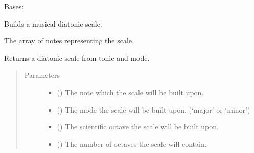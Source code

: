 \documentclass[letterpaper,10pt,english]{sphinxmanual}
\begin{document}

\begin{fulllineitems}
\label{\detokenize{birdears:birdears.scale.DiatonicScale}}
Bases: {\hyperref[\detokenize{index:birdears.scale.ScaleBase}]{}}

Builds a musical diatonic scale.

\begin{fulllineitems}
\label{\detokenize{birdears:birdears.scale.DiatonicScale.scale}}
 \textendash{} The array of notes representing the scale.

\end{fulllineitems}


\begin{fulllineitems}
\label{\detokenize{birdears:birdears.scale.DiatonicScale.__init__}}
Returns a diatonic scale from tonic and mode.
\begin{quote}\begin{description}
\item[{Parameters}] \leavevmode\begin{itemize}
\item {} 
 () \textendash{} The note which the scale will be built upon.

\item {} 
 () \textendash{} The mode the scale will be built upon.
(‘major’ or ‘minor’)

\item {} 
 () \textendash{} The scientific octave the scale will be built upon.

\item {} 
 () \textendash{} The number of octaves the scale will contain.


\end{itemize}
\end{description}
\end{quote}
\end{fulllineitems}
\end{fulllineitems}
\end{document}
